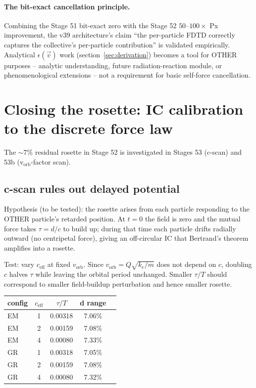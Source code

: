 \documentclass[11pt,a4paper]{article}
\begin{document}
\paragraph{The bit-exact cancellation principle.}  Combining the
Stage 51 bit-exact zero with the Stage 52 $50$--$100\times$ Px
improvement, the v39 architecture's claim ``the per-particle FDTD
correctly captures the collective's per-particle contribution''
is validated empirically.  Analytical $\epsilon(\vec v)$ work
(section~\ref{sec:derivation}) becomes a tool for OTHER purposes --
analytic understanding, future radiation-reaction module, or
phenomenological extensions -- not a requirement for basic self-force
cancellation.

\section{Closing the rosette: IC calibration to the discrete force law}

The $\sim 7\%$ residual rosette in Stage 52 is investigated in Stages
53 (c-scan) and 53b (v$_{\mathrm{orb}}$-factor scan).

\subsection{c-scan rules out delayed potential}

Hypothesis (to be tested): the rosette arises from each particle
responding to the OTHER particle's retarded position.  At $t=0$ the
field is zero and the mutual force takes $\tau = d/c$ to build up;
during that time each particle drifts radially outward (no centripetal
force), giving an off-circular IC that Bertrand's theorem amplifies
into a rosette.

Test: vary $c_{\mathrm{eff}}$ at fixed $v_{\mathrm{orb}}$.  Since
$v_{\mathrm{orb}} = Q\sqrt{k_e/m}$ does not depend on $c$, doubling
$c$ halves $\tau$ while leaving the orbital period unchanged.  Smaller
$\tau/T$ should correspond to smaller field-buildup perturbation
and hence smaller rosette.

\begin{center}
\begin{tabular}{lcccc}
\toprule
config & $c_{\mathrm{eff}}$ & $\tau/T$ & d range \\
\midrule
EM & 1 & 0.00318 & 7.06\% \\
EM & 2 & 0.00159 & 7.08\% \\
EM & 4 & 0.00080 & 7.33\% \\
GR & 1 & 0.00318 & 7.05\% \\
GR & 2 & 0.00159 & 7.08\% \\
GR & 4 & 0.00080 & 7.32\% \\
\bottomrule
\end{tabular}
\end{center}
\end{document}
